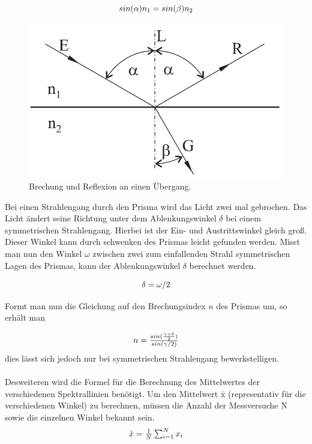 \documentclass[12pt,a4paper,twoside]{article}
\begin{document}
\begin{equation}
    \label{eq:Snellius}
    \centerline{$sin(\alpha) n_1 = sin(\beta) n_2$}
\end{equation}

\begin{figure}[H]
    \centering
    \includegraphics[width=0.6\linewidth]{nudes/Brechung.png}
    \caption{Brechung und Reflexion an einen Übergang. \cite{teachcenter2}}
    \label{fig:brechung}
\end{figure}

\noindent
Bei einen Strahlengang durch den Prisma wird das Licht zwei mal gebrochen. 
Das Licht ändert seine Richtung unter dem Ablenkungswinkel $\delta $ bei einem symmetrischen Strahlengang. Hierbei ist der Ein- und Austrittswinkel gleich groß. 
Dieser Winkel kann durch schwenken des Prismas leicht gefunden werden. 
Misst man nun den Winkel $\omega$ zwischen zwei zum einfallenden Strahl symmetrischen Lagen des Prismas, kann der Ablenkungswinkel $\delta $ berechnet werden. 

\begin{equation}
    \label{eq:Ablenkungswinkel}
    \centerline{$\delta = \omega /2$}
\end{equation}

\noindent
Formt man nun die Gleichung auf den Brechungsindex $n$ des Prismas um, so erhält man

\begin{equation}
    \label{eq:Brechungsindex}
    \centerline{$ n = \frac{sin(\frac{\gamma + \delta }{2})}{sin(\gamma /2)}$}
\end{equation}
dies lässt sich jedoch nur bei symmetrischen Strahlengang bewerkstelligen. 
\\
\\
Desweiteren wird die Formel für die Berechnung des Mittelwertes der verschiedenen Spektrallinien benötigt. Um den Mittelwert \={x} (representativ für die verschiedenen Winkel) zu berechnen, müssen die Anzahl der Messversuche N sowie die einzelnen Winkel bekannt sein. 
\begin{equation}
    \label{eq:Mittelwert}
    \centerline{$\bar{x} = \frac{1}{N} \sum_{i = 1}^{N} x_i $}
\end{equation}
\end{document}
